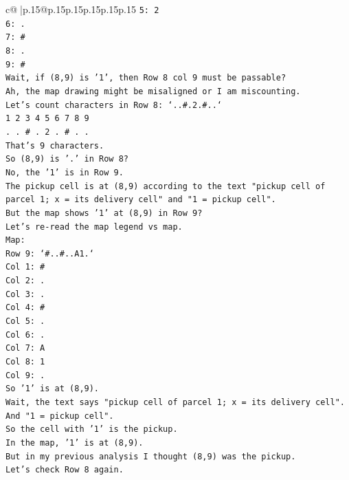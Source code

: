\documentclass{article}
\begin{document}
{\begin{supertabular}{c@{$\;$}|p{.15\linewidth}@{}p{.15\linewidth}p{.15\linewidth}p{.15\linewidth}p{.15\linewidth}p{.15\linewidth}}
{{{\texttt{5: 2} \\
\texttt{6: .} \\
\texttt{7: \#} \\
\texttt{8: .} \\
\texttt{9: \#} \\
\texttt{Wait, if (8,9) is '1', then Row 8 col 9 must be passable?} \\
\texttt{Ah, the map drawing might be misaligned or I am miscounting.} \\
\texttt{Let's count characters in Row 8: `..\#.2.\#..`} \\
\texttt{1 2 3 4 5 6 7 8 9} \\
\texttt{. . \# . 2 . \# . .} \\
\texttt{That's 9 characters.} \\
\texttt{So (8,9) is '.' in Row 8?} \\
\texttt{No, the '1' is in Row 9.} \\
\texttt{The pickup cell is at (8,9) according to the text "pickup cell of parcel 1; x = its delivery cell" and "1 = pickup cell".} \\
\texttt{But the map shows '1' at (8,9) in Row 9?} \\
\texttt{Let's re{-}read the map legend vs map.} \\
\texttt{Map:} \\
\texttt{Row 9: `\#..\#..A1.`} \\
\texttt{Col 1: \#} \\
\texttt{Col 2: .} \\
\texttt{Col 3: .} \\
\texttt{Col 4: \#} \\
\texttt{Col 5: .} \\
\texttt{Col 6: .} \\
\texttt{Col 7: A} \\
\texttt{Col 8: 1} \\
\texttt{Col 9: .} \\
\texttt{So '1' is at (8,9).} \\
\texttt{Wait, the text says "pickup cell of parcel 1; x = its delivery cell".} \\
\texttt{And "1 = pickup cell".} \\
\texttt{So the cell with '1' is the pickup.} \\
\texttt{In the map, '1' is at (8,9).} \\
\texttt{But in my previous analysis I thought (8,9) was the pickup.} \\
\texttt{Let's check Row 8 again.} \\
}}}
\end{supertabular}}
\end{document}
